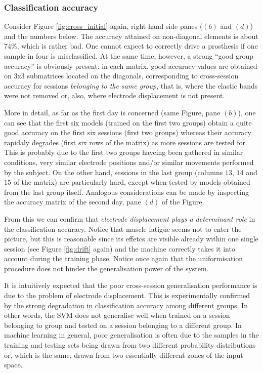 \subsubsection{Classification accuracy}

Consider Figure \ref{fig:cross_initial} again, right hand side panes
($(b)$ and $(d)$) and the numbers below. The accuracy attained on
non-diagonal elements is about $74\%$, which is rather bad. One cannot
expect to correctly drive a prosthesis if one sample in four is
misclassified. At the same time, however, a strong ``good group
accuracy'' is obviously present: in each matrix, good accuracy values
are obtained on 3x3 submatrices located on the diagonals,
corresponding to cross-session accuracy for sessions \emph{belonging
to the same group}, that is, where the elastic bands were not removed
or, also, where electrode displacement is not present.

More in detail, as far as the first day is concerned (same Figure,
pane $(b)$), one can see that the first six models (trained on the
first two groups) obtain a quite good accuracy on the first six
sessions (first two groups) whereas their accuracy rapidaly degrades
(first six rows of the matrix) as more sessions are tested for. This
is probably due to the first two groups haveing been gathered in
similar conditions, very similar electrode positions and/or similar
movements performed by the subject. On the other hand, sessions in the
last group (columns $13$, $14$ and $15$ of the matrix) are
particularly hard, except when tested by models obtained from the last
group itself. Analogous considerations can be made by inspecting the
accuracy matrix of the second day, pane $(d)$ of the Figure.

From this we can confirm that \emph{electrode displacement plays a
determinant role} in the classification accuracy. Notice that muscle
fatigue seems not to enter the picture, but this is reasonable since
its effetcs are visible already within one single session (see Figure
\ref{fig:drift} again) and the machine correctly takes it into account
during the training phase. Notice once again that the uniformisation
procedure does not hinder the generalisation power of the system.

It is intuitively expected that the poor cross-session generalisation
performance is due to the problem of electrode displacement. This is
experimentally confirmed by the strong degradation in classification
accuracy among different groups. In other words, the SVM does not
generalise well when trained on a session belonging to group and
tested on a session belonging to a different group. In machine
learning in general, poor generalisation is often due to the samples
in the training and testing sets being drawn from two different
probability distributions or, which is the same, drawn from two
essentially different zones of the input space.


